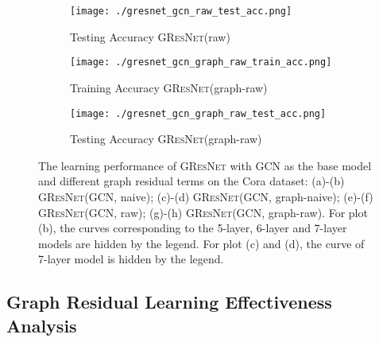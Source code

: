 \documentclass{article}
\newcommand{\gresnet}{\textsc{GResNet}}
\newcommand{\gcn}{\textsc{GCN}}
\begin{document}
\begin{figure}
\begin{subfigure}[b]{.24\textwidth}
    \end{subfigure}\hfill
    \begin{subfigure}[b]{.24\textwidth}
    	\texttt{[image: ./gresnet\_gcn\_raw\_test\_acc.png]}
	\vspace{-10pt}
	\captionsetup{justification=centering}
    	\caption{Testing Accuracy {\gresnet}(raw)}\label{fig:gresnet_raw_acc_test}
    \end{subfigure}\hfill
    \begin{subfigure}[b]{.24\textwidth}
    	\texttt{[image: ./gresnet\_gcn\_graph\_raw\_train\_acc.png]}
	\vspace{-10pt}
	\captionsetup{justification=centering}
    	\caption{Training Accuracy {\gresnet}(graph-raw)}\label{fig:gresnet_graph_raw_acc_train}
    \end{subfigure}\hfill
    \begin{subfigure}[b]{.24\textwidth}
    	\texttt{[image: ./gresnet\_gcn\_graph\_raw\_test\_acc.png]}
	\vspace{-10pt}
	\captionsetup{justification=centering}
    	\caption{Testing Accuracy {\gresnet}(graph-raw)}\label{fig:gresnet_graph_raw_acc_test}
    \end{subfigure}\vspace{-7pt}
    \caption{The learning performance of {\gresnet} with {\gcn} as the base model and different graph residual terms on the Cora dataset: (a)-(b) {\gresnet}({\gcn}, naive); (c)-(d) {\gresnet}({\gcn}, graph-naive); (e)-(f) {\gresnet}({\gcn}, raw); (g)-(h) {\gresnet}({\gcn}, graph-raw). For plot (b), the curves corresponding to the 5-layer, 6-layer and 7-layer models are hidden by the legend. For plot (c) and (d), the curve of 7-layer model is hidden by the legend.}\label{fig:gresnet_gcn_analysis}
     \vspace{-12pt}
\end{figure}


\vspace{-8pt}
\subsection{Graph Residual Learning Effectiveness Analysis}
\vspace{-8pt}
\end{document}
